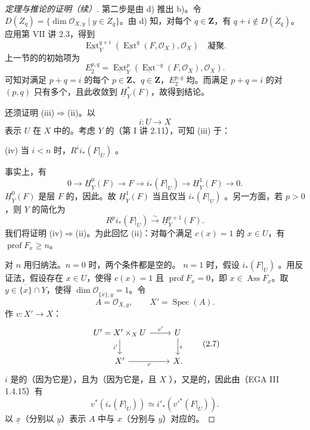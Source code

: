 \begin{proof}[定理与推论的证明（续）]
第二步是由 d) 推出 b)。令 $D(Z_q)=\{\dim\mathscr O_{X,y}\mid y\in Z_q\}$。由 d) 知，对每个 $q\in\mathbf Z$，有 $q+i\notin D(Z_q)$。应用第 VII 讲 2.3，得到
\[\underline{\operatorname{Ext}}^{q+i}_Y(\underline{\operatorname{Ext}}^q(F,\mathscr O_X),\mathscr O_X)\quad\text{凝聚}.\]
上一节的的初始项为
\[E^{p,q}_2=\underline{\operatorname{Ext}}^p_Y(\underline{\operatorname{Ext}}^{-q}(F,\mathscr O_X),\mathscr O_X).\]
可知对满足 $p+q=i$ 的每个 $p\in\mathbf Z$、$q\in\mathbf Z$，$E^{p,q}_2$ 均。而满足 $p+q=i$ 的对 $(p,q)$ 只有多个，且此收敛到 $\underline H^*_Y(F)$，故得到结论。

还须证明 (iii)$\Rightarrow$(ii)。以
\[i:U\longrightarrow X\]
表示 $U$ 在 $X$ 中的。考虑 $Y$ 的（第 I 讲 2.11），可知 (iii) 于：

 (iv) 当 $i<n$ 时，$R^ii_*(F|_U)$ 。

事实上，有
\[0\longrightarrow\underline H^0_Y(F)\longrightarrow F\longrightarrow i_*(F|_U)\longrightarrow\underline H^1_Y(F)\longrightarrow0.\]
$\underline H^0_Y(F)$ 是层 $F$ 的，因此。故 $\underline H^1_Y(F)$ 当且仅当 $i_*(F|_U)$ 。另一方面，若 $p>0$，则 $Y$ 的简化为
\[R^pi_*(F|_U)\xrightarrow{\sim}\underline H^{p+1}_Y(F).\]
我们将证明 (iv)$\Rightarrow$(ii)。为此回忆 (ii)：对每个满足 $c(x)=1$ 的 $x\in U$，有 $\operatorname{prof}F_x\geq n$。

对 $n$ 用归纳法。$n=0$ 时，两个条件都是空的。
$n=1$ 时，假设 $i_*(F|_U)$ 。用反证法，假设存在 $x\in U$，使得 $c(x)=1$ 且 $\operatorname{prof}F_x=0$，即 $x\in\operatorname{Ass}F_x$。取 $y\in\overline{\{x\}}\cap Y$，使得 $\dim\mathscr O_{\overline{\{x\}},y}=1$。令
\[A=\mathscr O_{X,y},\qquad X'=\operatorname{Spec}(A).\]
作 $v:X'\to X$：
\[
\begin{tikzcd}
U'=X'\times_XU\arrow[r,"v'"]\arrow[d,"i'"']&U\arrow[d,"i"]\\
X'\arrow[r,"v"']&X.
\end{tikzcd}\tag{2.7}
\]
 $i$ 是的（因为它是），且为（因为它是，且 $X$ ），又是的，因此由（EGA III 1.4.15）有
\[v^*(i_*(F|_U))\simeq i'_*(v'^*(F|_U)).\tag{2.8}\]
以 $\underline x$（分别以 $\underline y$）表示 $A$ 中与 $x$（分别与 $y$）对应的。


\end{proof}
